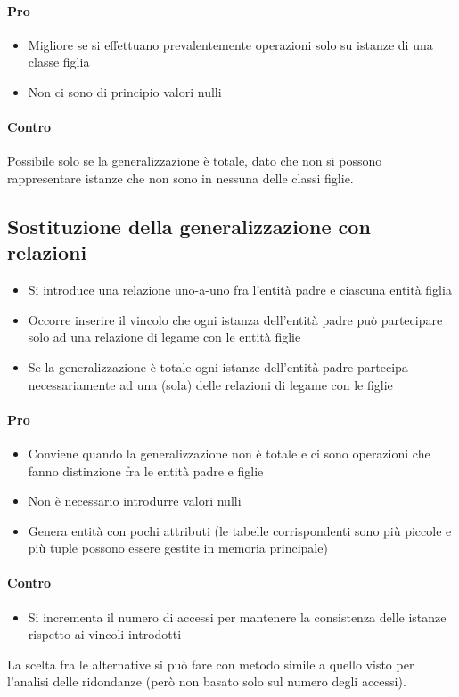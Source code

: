 \paragraph*{Pro}
\begin{itemize}
    \item Migliore se si effettuano prevalentemente operazioni solo su istanze di una classe figlia
    \item Non ci sono di principio valori nulli
\end{itemize}
\paragraph*{Contro}
Possibile solo se la generalizzazione è totale, dato che non si possono rappresentare istanze
che non sono in nessuna delle classi figlie.
\subsection{Sostituzione della generalizzazione con relazioni}
\begin{itemize}
    \item Si introduce una relazione uno-a-uno fra l'entità padre e ciascuna entità figlia
    \item Occorre inserire il vincolo che ogni istanza dell'entità padre può partecipare solo ad 
    una relazione di legame con le entità figlie
    \item Se la generalizzazione è totale ogni istanze dell'entità padre partecipa necessariamente ad una
    (sola) delle relazioni di legame con le figlie
\end{itemize}
\paragraph*{Pro}
\begin{itemize}
    \item Conviene quando la generalizzazione non è totale e ci sono operazioni
    che fanno distinzione fra le entità padre e figlie
    \item Non è necessario introdurre valori nulli
    \item Genera entità con pochi attributi (le tabelle corrispondenti sono più piccole
    e più tuple possono essere gestite in memoria principale)
\end{itemize}
\paragraph*{Contro}
\begin{itemize}
    \item Si incrementa il numero di accessi per mantenere la consistenza delle istanze rispetto
    ai vincoli introdotti
\end{itemize}
La scelta fra le alternative si può fare con metodo simile a quello visto per l'analisi
delle ridondanze (però non basato solo sul numero degli accessi).

